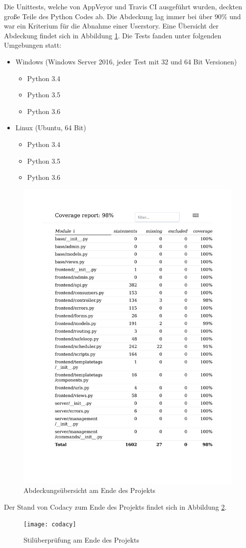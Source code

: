 Die Unittests, welche von AppVeyor und Travis CI ausgeführt wurden, deckten große Teile des Python Codes ab.
Die Abdeckung lag immer bei über 90\% und war ein Kriterium für die Abnahme einer Userstory. Eine Übersicht der Abdeckung
findet sich in Abbildung \ref{coverage_pdf}.
Die Tests fanden unter folgenden Umgebungen statt:
\begin{itemize}
	\item Windows (Windows Server 2016, jeder Test mit 32 und 64 Bit Versionen)
		\begin{itemize}
			\item Python 3.4
			\item Python 3.5
			\item Python 3.6
		\end{itemize}
	\item Linux (Ubuntu, 64 Bit)
		\begin{itemize}
			\item Python 3.4
			\item Python 3.5
			\item Python 3.6
		\end{itemize}
\end{itemize}
\begin{figure}[t]
	\centering
\includegraphics[width=.8\textwidth]{img/coverage.pdf}
	\caption{Abdeckungsübersicht am Ende des Projekts}
	\label{coverage_pdf}
\end{figure}
Der Stand von Codacy zum Ende des Projekts findet sich in Abbildung \ref{codacy_png}.
\begin{figure}[t]
	\centering
\texttt{[image: codacy]}
	\caption{Stilüberprüfung am Ende des Projekts}
	\label{codacy_png}
\end{figure}
